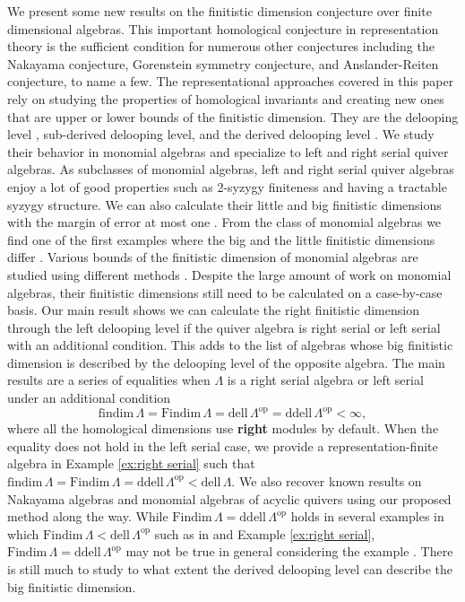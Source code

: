 \documentclass{conm-p-l}
\newcommand{\findim}{\mathrm{findim}\,}
\newcommand{\Findim}{\mathrm{Findim}\,}
\newcommand{\dell}{\mathrm{dell}\,}
\renewcommand{\dell}{\mathrm{dell}\,}
\newcommand{\op}{\mathrm{op}}
\newcommand{\ddell}{\mathrm{ddell}\,}
\theoremstyle{definition}
\theoremstyle{remark}
\numberwithin{equation}{section}
\begin{document}
We present some new results on the finitistic dimension conjecture over finite dimensional algebras. This important homological conjecture in representation theory is the sufficient condition for numerous other conjectures including the Nakayama conjecture, Gorenstein symmetry conjecture, and Anslander-Reiten conjecture, to name a few. The representational approaches covered in this paper rely on studying the properties of homological invariants and creating new ones that are upper or lower bounds of the finitistic dimension. They are the delooping level \cite{gelinas2022}, sub-derived delooping level, and the derived delooping level \cite{guo2025derived}. We study their behavior in monomial algebras and specialize to left and right serial quiver algebras. As subclasses of monomial algebras, left and right serial quiver algebras enjoy a lot of good properties such as 2-syzygy finiteness and having a tractable syzygy structure. We can also calculate their little and big finitistic dimensions with the margin of error at most one \cite{huisgen1991predicting}. From the class of monomial algebras we find one of the first examples where the big and the little finitistic dimensions differ \cite{huisgen1992homological}. Various bounds of the finitistic dimension of monomial algebras are studied using different methods \cite{green1985projective, GKK1991, igusa1990syzygy, shi2003finitistic}. Despite the large amount of work on monomial algebras, their finitistic dimensions still need to be calculated on a case-by-case basis. Our main result shows we can calculate the right finitistic dimension through the left delooping level if the quiver algebra is right serial or left serial with an additional condition. This adds to the list of algebras whose big finitistic dimension is described by the delooping level of the opposite algebra. The main results are a series of equalities when $\Lambda$ is a right serial algebra or left serial under an additional condition
\[
\findim\Lambda = \Findim\Lambda = \dell\Lambda^{\op} = \ddell\Lambda^{\op} < \infty,
\]
where all the homological dimensions use \textbf{right} modules by default. When the equality does not hold in the left serial case, we provide a representation-finite algebra in Example \ref{ex:right serial} such that $\findim\Lambda = \Findim\Lambda = \ddell\Lambda^{\op} < \dell\Lambda$. We also recover known results on Nakayama algebras and monomial algebras of acyclic quivers using our proposed method along the way. While $\Findim\Lambda = \ddell\Lambda^{\op}$ holds in several examples in which $\Findim\Lambda<\dell\Lambda^{\op}$ such as in \cite[Example 3.8]{guo2025derived} and Example \ref{ex:right serial}, $\Findim\Lambda=\ddell\Lambda^{\op}$ may not be true in general considering the example \cite[Example 4.22]{barrios2024delooping}. There is still much to study to what extent the derived delooping level can describe the big finitistic dimension.
\end{document}
